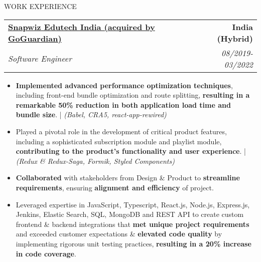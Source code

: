 \documentclass{resume} %
\begin{document}
\begin{rSection}{WORK EXPERIENCE}
   \begin{tabularx}{\textwidth}{@{}X r}
      \textbf{\href{https://edulastic.com/}{Snapwiz Edutech India (acquired by GoGuardian)}} & \textbf{India (Hybrid)} \\
      \textit{Software Engineer} & \textit{08/2019-03/2022} \\
   \end{tabularx}

   \begin{minipage}[t]{1\textwidth}
      \begin{itemize}[left=0pt, nosep, before=\vspace{-0.5\baselineskip}]

\item \small \textbf{Implemented advanced performance optimization techniques}, including front-end bundle optimization and route splitting, \textbf{resulting in a remarkable 50\% reduction in both application load time and bundle size}. | \textit{(Babel, CRA5, react-app-rewired)}
\item \small Played a pivotal role in the development of critical product features, including a sophisticated subscription module and playlist module, \textbf{contributing to the product's functionality and user experience}. | \textit{(Redux \& Redux-Saga, Formik, Styled Components)}
\item \small \textbf{Collaborated} with stakeholders from Design \& Product to \textbf{streamline requirements}, ensuring \textbf{alignment and efficiency} of project.
\item \small Leveraged expertise in JavaScript, Typescript, React.js, Node.js, Express.js, Jenkins, Elastic Search, SQL, MongoDB and REST API to create custom frontend \& backend integrations that \textbf{met unique project requirements} and exceeded customer expectations \& \textbf{elevated code quality} by implementing rigorous unit testing practices, \textbf{resulting in a 20\% increase in code coverage}.


      \end{itemize}
   \end{minipage}

\end{rSection}
\end{document}
